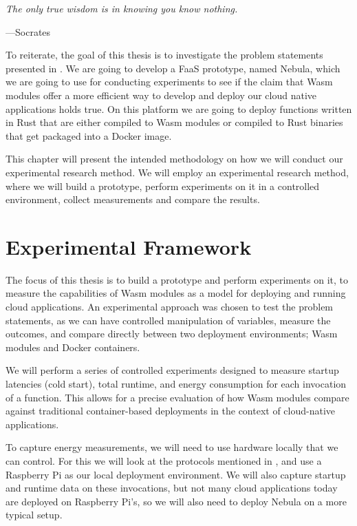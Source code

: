 \documentclass[
  table]{report}
\begin{document}
\setlength{}
\epigraph{\itshape 
The only true wisdom is in knowing you know nothing.
}{---Socrates}

To reiterate, the goal of this thesis is to investigate the problem
statements presented in . We are going to develop a
FaaS prototype, named Nebula, which we are going to use for conducting
experiments to see if the claim that \ac{Wasm} modules offer a more
efficient way to develop and deploy our cloud native applications holds
true. On this platform we are going to deploy functions written in Rust
that are either compiled to \ac{Wasm} modules or compiled to Rust
binaries that get packaged into a Docker image.

This chapter will present the intended methodology on how we will
conduct our experimental research method. We will employ an experimental
research method, where we will build a prototype, perform experiments on
it in a controlled environment, collect measurements and compare the
results.

\section{Experimental Framework}
\label{sect:exp_frame}

The focus of this thesis is to build a prototype and perform experiments
on it, to measure the capabilities of \ac{Wasm} modules as a model for
deploying and running cloud applications. An experimental approach was
chosen to test the problem statements, as we can have controlled
manipulation of variables, measure the outcomes, and compare directly
between two deployment environments; \ac{Wasm} modules and Docker
containers.

We will perform a series of controlled experiments designed to measure
startup latencies (cold start), total runtime, and energy consumption
for each invocation of a function. This allows for a precise evaluation
of how \ac{Wasm} modules compare against traditional container-based
deployments in the context of cloud-native applications.

To capture energy measurements, we will need to use hardware locally
that we can control. For this we will look at the protocols mentioned in
, and use a Raspberry Pi as our local
deployment environment. We will also capture startup and runtime data on
these invocations, but not many cloud applications today are deployed on
Raspberry Pi's, so we will also need to deploy Nebula on a more typical
setup.
\end{document}
